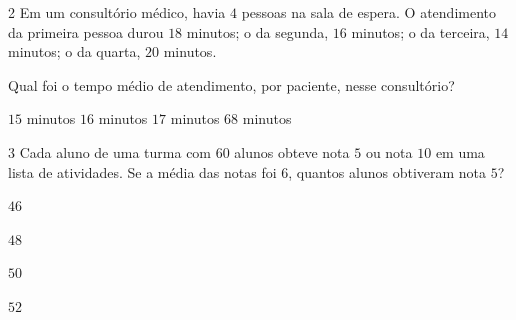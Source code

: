 
\num{2}  Em um consultório médico, havia $4$ pessoas na sala de espera. O
atendimento da primeira pessoa durou $18$ minutos; o da segunda, $16$
minutos; o da terceira, $14$ minutos; o da quarta, $20$ minutos.

Qual foi o tempo médio de atendimento, por paciente, nesse consultório?

\begin{boxlist}
\boxitem[] $15$ minutos
\boxitem[] $16$ minutos
\boxitem[] $17$ minutos
\boxitem[] $68$ minutos
\end{boxlist}



\num{3}  Cada aluno de uma turma com $60$ alunos obteve nota $5$ ou nota $10$ em uma
lista de atividades. Se a média das notas foi $6$, quantos alunos
obtiveram nota $5$?

\begin{escolha}
\item $46$
\item $48$
\item $50$
\item $52$
\end{escolha}

